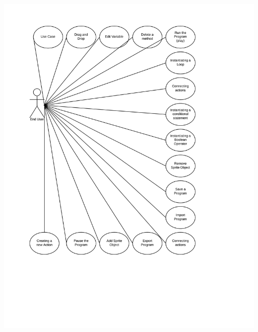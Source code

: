 \documentclass[a4paper, 10pt, oneside]{article}
\begin{document}
\begin{usecase}
\includegraphics[scale=.2]{req_uml_diag.png}
\end{usecase}
\end{document}
